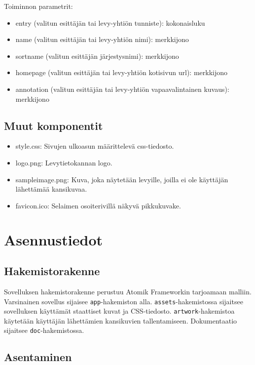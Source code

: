 \documentclass[a4paper,12pt]{report}
\begin{document}
Toiminnon parametrit:
\begin{itemize}
  \item entry (valitun esittäjän tai levy-yhtiön tunniste): kokonaisluku
  \item name (valitun esittäjän tai levy-yhtiön nimi): merkkijono
  \item sortname (valitun esittäjän järjestysnimi): merkkijono
  \item homepage (valitun esittäjän tai levy-yhtiön kotisivun url): merkkijono
  \item annotation (valitun esittäjän tai levy-yhtiön vapaavalintainen
    kuvaus): merkkijono
\end{itemize}

\subsection{Muut komponentit}

\begin{itemize}
  \item style.css: Sivujen ulkoasun määrittelevä css-tiedosto.
  \item logo.png: Levytietokannan logo.
  \item sampleimage.png: Kuva, joka näytetään levyille, joilla ei ole
    käyttäjän lähettämää kansikuvaa.
  \item favicon.ico: Selaimen osoiterivillä näkyvä pikkukuvake.
\end{itemize}

\section{Asennustiedot}

\subsection{Hakemistorakenne}

Sovelluksen hakemistorakenne perustuu Atomik Frameworkin tarjoamaan malliin.
Varsinainen sovellus sijaisee \texttt{app}-hakemiston alla.
\texttt{assets}-hakemistossa sijaitsee sovelluksen käyttämät staattiset
kuvat ja CSS-tiedosto. \texttt{artwork}-hakemistoa käytetään käyttäjän
lähettämien kansikuvien tallentamiseen. Dokumentaatio sijaitsee
\texttt{doc}-hakemistossa.

\subsection{Asentaminen}
\end{document}
